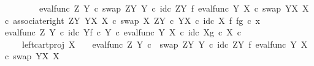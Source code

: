 \begin{isabellebody}
\ \ \ \ \ \ \ \ \ {\isacharparenleft}{\kern0pt}{\isacharparenleft}{\kern0pt}eval{\isacharunderscore}{\kern0pt}func\ Z\ Y\ {\isasymcirc}\isactrlsub c\ swap\ {\isacharparenleft}{\kern0pt}Z\isactrlbsup Y\isactrlesup {\isacharparenright}{\kern0pt}\ Y\ {\isasymcirc}\isactrlsub c\ {\isacharparenleft}{\kern0pt}id\isactrlsub c\ {\isacharparenleft}{\kern0pt}Z\isactrlbsup Y\isactrlesup {\isacharparenright}{\kern0pt}\ {\isasymtimes}\isactrlsub f\ eval{\isacharunderscore}{\kern0pt}func\ Y\ X\ {\isasymcirc}\isactrlsub c\ swap\ {\isacharparenleft}{\kern0pt}Y\isactrlbsup X\isactrlesup {\isacharparenright}{\kern0pt}\ X{\isacharparenright}{\kern0pt}\ {\isasymcirc}\isactrlsub c\ associate{\isacharunderscore}{\kern0pt}right\ {\isacharparenleft}{\kern0pt}Z\isactrlbsup Y\isactrlesup {\isacharparenright}{\kern0pt}\ {\isacharparenleft}{\kern0pt}Y\isactrlbsup X\isactrlesup {\isacharparenright}{\kern0pt}\ X\ {\isasymcirc}\isactrlsub c\ swap\ X\ {\isacharparenleft}{\kern0pt}Z\isactrlbsup Y\isactrlesup \ {\isasymtimes}\isactrlsub c\ Y\isactrlbsup X\isactrlesup {\isacharparenright}{\kern0pt}{\isacharparenright}{\kern0pt}\ {\isasymcirc}\isactrlsub c\ id\isactrlsub c\ X\ {\isasymtimes}\isactrlsub f\ {\isasymlangle}f{\isacharcomma}{\kern0pt}g{\isasymrangle}{\isacharparenright}{\kern0pt}\ {\isasymcirc}\isactrlsub c\ x{}{\isachardoublequoteclose}\isacommand{{\isachardot}{\kern0pt}}\isamarkupfalse%
\isanewline
\ \ \isamarkupfalse%
\isanewline
\ \ \isamarkupfalse%
\ \isamarkupfalse%
\ {\isachardoublequoteopen}{\isacharparenleft}{\kern0pt}{\isacharparenleft}{\kern0pt}{\isacharparenleft}{\kern0pt}eval{\isacharunderscore}{\kern0pt}func\ Z\ Y\ {\isasymcirc}\isactrlsub c\ {\isasymlangle}id\isactrlsub c\ Y{\isacharcomma}{\kern0pt}f\ {\isasymcirc}\isactrlsub c\ {\isasymbeta}\isactrlbsub Y\isactrlesub {\isasymrangle}{\isacharparenright}{\kern0pt}\ {\isasymcirc}\isactrlsub c\ eval{\isacharunderscore}{\kern0pt}func\ Y\ X\ {\isasymcirc}\isactrlsub c\ {\isasymlangle}id\isactrlsub c\ X{\isacharcomma}{\kern0pt}g\ {\isasymcirc}\isactrlsub c\ {\isasymbeta}\isactrlbsub X\isactrlesub {\isasymrangle}{\isacharparenright}{\kern0pt}\ {\isasymcirc}\isactrlsub c\isanewline
\ \ \ \ \ left{\isacharunderscore}{\kern0pt}cart{\isacharunderscore}{\kern0pt}proj\ X\ {\isasymone}{\isacharparenright}{\kern0pt}\isactrlsup {\isasymsharp}\ {\isacharequal}{\kern0pt}\ \ {\isacharparenleft}{\kern0pt}eval{\isacharunderscore}{\kern0pt}func\ Z\ Y\ {\isasymcirc}\isactrlsub c\ \ swap\ {\isacharparenleft}{\kern0pt}Z\isactrlbsup Y\isactrlesup {\isacharparenright}{\kern0pt}\ Y\ {\isasymcirc}\isactrlsub c\ {\isacharparenleft}{\kern0pt}id\isactrlsub c\ {\isacharparenleft}{\kern0pt}Z\isactrlbsup Y\isactrlesup {\isacharparenright}{\kern0pt}\ {\isasymtimes}\isactrlsub f\ {\isacharparenleft}{\kern0pt}eval{\isacharunderscore}{\kern0pt}func\ Y\ X\ {\isasymcirc}\isactrlsub c\ swap\ {\isacharparenleft}{\kern0pt}Y\isactrlbsup X\isactrlesup {\isacharparenright}{\kern0pt}\ X{\isacharparenright}{\kern0pt}{\isacharparenright}{\kern0pt}\isanewline

\end{isabellebody}
